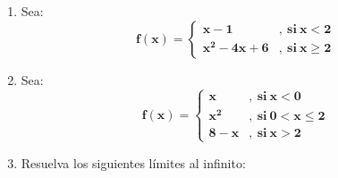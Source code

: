 \documentclass[12pt]{article}
\begin{document}
\begin{enumerate}
            \item Sea: 
                \[
                    \boldsymbol{
                        f(x) = 
                        \left\{
                            \begin{array}{ll}
                                x - 1 & ,\ \text{si} \ x < 2 \\
                                x ^2 - 4x + 6 & ,\ \text{si} \ x \geq 2
                            \end{array}
                        \right.
                    }
                \]

            \item Sea: 
                \[
                    \boldsymbol{
                        f(x) = 
                        \left\{
                            \begin{array}{ll}
                                x & ,\ \text{si} \ x < 0 \\
                                x ^2 & ,\ \text{si} \ 0 < x \leq 2 \\
                                8 - x & ,\ \text{si} \ x > 2
                            \end{array}
                        \right.
                    }
                \]
            
            
            \item Resuelva los siguientes límites al infinito:
                

        
        \end{enumerate}
\end{document}
